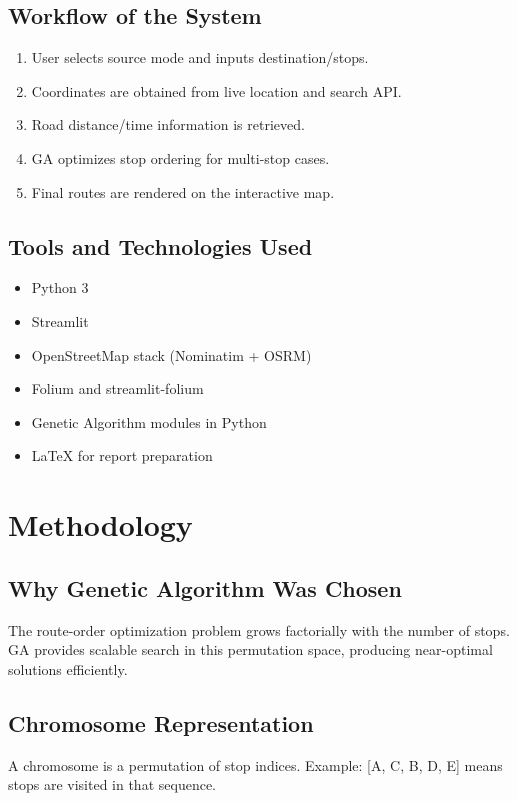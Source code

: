 \documentclass[12pt,a4paper]{report}
\begin{document}
\section{Workflow of the System}
\begin{enumerate}
    \item User selects source mode and inputs destination/stops.
    \item Coordinates are obtained from live location and search API.
    \item Road distance/time information is retrieved.
    \item GA optimizes stop ordering for multi-stop cases.
    \item Final routes are rendered on the interactive map.
\end{enumerate}

\section{Tools and Technologies Used}
\begin{itemize}
    \item Python 3
    \item Streamlit
    \item OpenStreetMap stack (Nominatim + OSRM)
    \item Folium and streamlit-folium
    \item Genetic Algorithm modules in Python
    \item LaTeX for report preparation
\end{itemize}

\chapter{Methodology}

\section{Why Genetic Algorithm Was Chosen}
The route-order optimization problem grows factorially with the number of stops. GA provides scalable search in this permutation space, producing near-optimal solutions efficiently.

\section{Chromosome Representation}
A chromosome is a permutation of stop indices. Example: [A, C, B, D, E] means stops are visited in that sequence.
\end{document}
